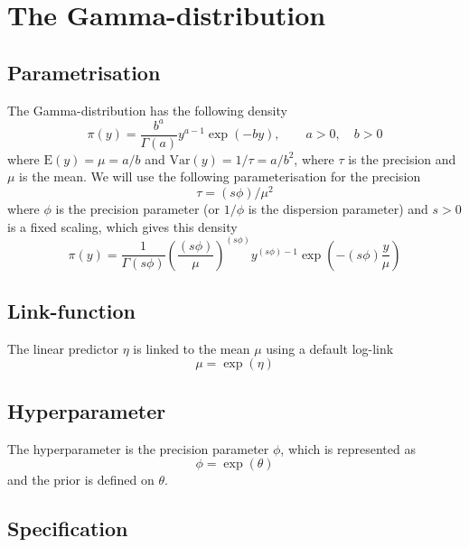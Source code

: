 \documentclass[a4paper,11pt]{article}
\begin{document}
\section*{The Gamma-distribution}

\subsection*{Parametrisation}

The Gamma-distribution has the following density
\begin{displaymath}
    \pi(y) = \frac{b^{a}}{\Gamma(a)} y^{a-1} \exp(-by), \qquad a>0,
    \quad b>0
\end{displaymath}
where $\text{E}(y) = \mu = a/b$ and $\text{Var}(y) = 1/\tau = a/b^{2}$,
where $\tau$ is the precision and $\mu$ is the mean. We will use the
following parameterisation for the precision
\begin{displaymath}
    \tau = (s\phi) / \mu^{2}
\end{displaymath}
where $\phi$ is the precision parameter (or $1/\phi$ is the dispersion
parameter) and $s>0$ is a fixed scaling, which gives this density
\begin{displaymath}
    \pi(y) = \frac{1}{\Gamma(s\phi)}
    \left(\frac{(s\phi)}{\mu}\right)^{(s\phi)}
    y^{(s\phi) -1} \exp\left(-(s\phi) \frac{y}{\mu}\right)
\end{displaymath}


\subsection*{Link-function}

The linear predictor $\eta$ is linked to the mean $\mu$ using a
default log-link
\begin{displaymath}
    \mu = \exp(\eta)
\end{displaymath}

\subsection*{Hyperparameter}

The hyperparameter is the precision parameter $\phi$, which is
represented as
\begin{displaymath}
    \phi = \exp(\theta)
\end{displaymath}
and the prior is defined on $\theta$.

\subsection*{Specification}
\end{document}
